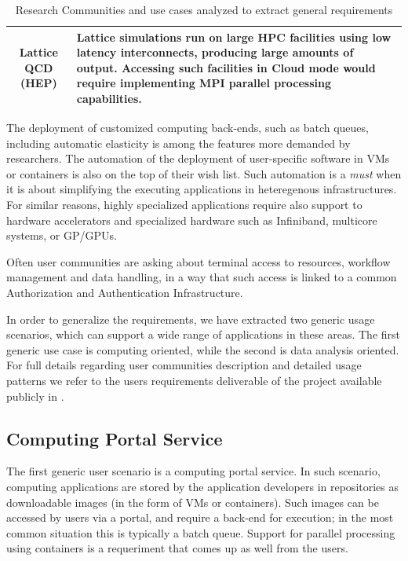 \documentclass{article}
\begin{document}
\begin{table}
\begin{tabular}{c|p{9cm}}
 \\   Lattice QCD  (HEP) & Lattice simulations run on large HPC facilities using low latency interconnects, producing large amounts of output. Accessing such facilities in Cloud mode would require implementing {\bf MPI parallel processing capabilities}. \\ \hline
  \end{tabular}
  \caption{Research Communities and use cases analyzed to extract general requirements}
  \label{tab:req}
\end{table}


The deployment of customized computing back-ends, such as batch queues, including automatic elasticity is among the features more demanded by researchers. The automation of the deployment of user-specific software in VMs or containers is also on the top of their wish list. Such automation is a {\sl must} when it is about simplifying the executing applications in heteregenous infrastructures. For similar reasons, highly specialized applications require also support to hardware accelerators and specialized hardware such as Infiniband, multicore systems, or GP/GPUs.

Often user communities are asking about terminal access to resources, workflow management and data handling, in a way that such access is linked to a common Authorization and Authentication Infrastructure. 

In order to generalize the requirements, we have extracted two generic usage scenarios, which can support a wide range of applications in these areas. The first generic use case is computing oriented, while the second is data analysis oriented. For full details regarding user communities description and detailed usage patterns we refer to the users requirements deliverable of the project available publicly in \cite{D21}.



\subsection{Computing Portal Service}

The first generic user scenario is a computing portal service. In such scenario, computing applications are stored by the application developers in repositories as downloadable images (in the form of VMs or containers). Such images can be accessed by users via a portal, and require a back-end for execution; in the most common situation this is typically a batch queue. Support for parallel processing using containers is a requeriment that comes up as well from the users.
\end{document}
